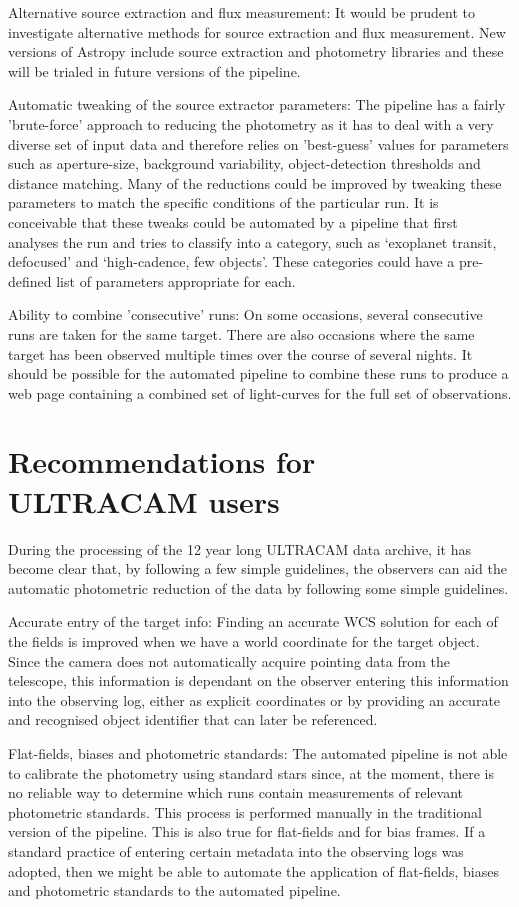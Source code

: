 {Alternative source extraction and flux measurement}: It would be prudent to investigate alternative methods for source extraction and flux measurement. New versions of Astropy include source extraction and photometry libraries and these will be trialed in future versions of the pipeline. 

{Automatic tweaking of the source extractor parameters}: The pipeline has a fairly 'brute-force' approach to reducing the photometry as it has to deal with a very diverse set of input data and therefore relies on 'best-guess' values for parameters such as aperture-size, background variability, object-detection thresholds and distance matching. Many of the reductions could be improved by tweaking these parameters to match the specific conditions of the particular run. It is conceivable that these tweaks could be automated by a pipeline that first analyses the run and tries to classify into a category, such as `exoplanet transit, defocused' and `high-cadence, few objects'. These categories could have a pre-defined list of parameters appropriate for each.
 
{Ability to combine 'consecutive' runs}: On some occasions, several consecutive runs are taken for the same target. There are also occasions where the same target has been observed multiple times over the course of several nights. It should be possible for the automated pipeline to combine these runs to produce a web page containing a combined set of light-curves for the full set of observations. 
 
\section{Recommendations for ULTRACAM users}
During the processing of the 12 year long ULTRACAM data archive, it has become clear that, by following a few simple guidelines, the observers can aid the automatic photometric reduction of the data by following some simple guidelines. 

{Accurate entry of the target info}: Finding an accurate WCS solution for each of the fields is improved when we have a world coordinate for the target object. Since the camera does not automatically acquire pointing data from the telescope, this information is dependant on the observer entering this information into the observing log, either as explicit coordinates or by providing an accurate and recognised object identifier that can later be referenced. 

{Flat-fields, biases and photometric standards}: The automated pipeline is not able to calibrate the photometry using standard stars since, at the moment, there is no reliable way to determine which runs contain measurements of relevant photometric standards. This process is performed manually in the traditional version of the pipeline. This is also true for flat-fields and for bias frames. If a standard practice of entering certain metadata into the observing logs was adopted, then we might be able to automate the application 
of flat-fields, biases and photometric standards to the automated pipeline. 

